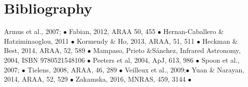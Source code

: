 \section*{Bibliography}
\vspace{-8pt}
\small
Armus et al., 2007; $\bullet$
Fabian, 2012, ARAA 50, 455 $\bullet$ 
Hernan-Caballero \& Hatziminaoglou, 2011 $\bullet$
Kormendy \& Ho, 2013, ARAA, 51, 511 $\bullet$
Heckman \& Best, 2014, ARAA, 52, 589  $\bullet$
Mampaso, Prieto \&Sánchez, Infrared Astronomy, 2004, ISBN  9780521548106 $\bullet$
Peeters et al, 2004, ApJ, 613, 986 $\bullet$
Spoon et al., 2007; $\bullet$
Tielens, 2008, ARAA, 46, 289  $\bullet$
Veilleux et al., 2009;$\bullet$
Yuan \& Narayan, 2014, ARAA, 52, 529 $\bullet$
Zakamska, 2016, MNRAS, 459, 3144 $\bullet$

\normalsize
\medskip \medskip \medskip \medskip


